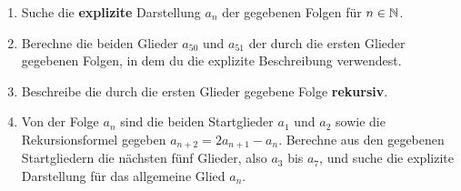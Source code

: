\documentclass[11pt,oneside]{article}
\begin{document}
	\begin{aufgabe} %
		\begin{enumerate}
			\item Suche die \textbf{explizite} Darstellung $a_n$ der gegebenen Folgen für $n\in\mathbb{N}$.
			\item Berechne die beiden Glieder $a_{50}$ und $a_{51}$ der durch die ersten Glieder gegebenen Folgen, in dem du die explizite Beschreibung verwendest.
			\item Beschreibe die durch die ersten Glieder gegebene Folge \textbf{rekursiv}.
			\item Von der Folge $a_n$ sind die beiden Startglieder $a_1$ und $a_2$ sowie die Rekursionsformel gegeben $a_{n+2}=2a_{n+1}-a_n$. Berechne aus den gegebenen Startgliedern die nächsten fünf Glieder, also $a_3$ bis $a_7$, und suche die explizite Darstellung für das allgemeine Glied $a_n$.
\end{enumerate}
\end{aufgabe}
\end{document}
